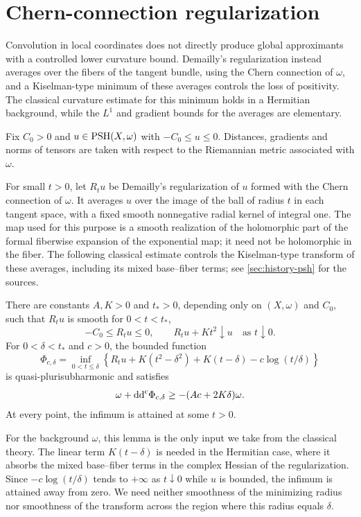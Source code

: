 \section{Chern-connection regularization}
\label{sec:psh-chern-regularization}

Convolution in local coordinates does not directly produce global approximants with a controlled lower curvature bound. Demailly's regularization instead averages over the fibers of the tangent bundle, using the Chern connection of $\omega$, and a Kiselman-type minimum of these averages controls the loss of positivity. The classical curvature estimate for this minimum holds in a Hermitian background, while the $L^1$ and gradient bounds for the averages are elementary.

Fix $C_0>0$ and $u\in\mathrm{PSH}(X,\omega)$ with $-C_0\leq u\leq0$. Distances, gradients and norms of tensors are taken with respect to the Riemannian metric associated with $\omega$.

For small $t>0$, let $R_tu$ be Demailly's regularization of $u$ formed with the Chern connection of $\omega$. It averages $u$ over the image of the ball of radius $t$ in each tangent space, with a fixed smooth nonnegative radial kernel of integral one. The map used for this purpose is a smooth realization of the holomorphic part of the formal fiberwise expansion of the exponential map; it need not be holomorphic in the fiber. The following classical estimate controls the Kiselman-type transform of these averages, including its mixed base--fiber terms; see \cref{sec:history-psh} for the sources.

\begin{lemma}\label{lem:chern-kiselman-input}
There are constants $A,K>0$ and $t_*>0$, depending only on $(X,\omega)$ and $C_0$, such that $R_tu$ is smooth for $0<t<t_*$,
\[
 -C_0\leq R_tu\leq0,\qquad
 R_tu+Kt^2\downarrow u\quad\text{as }t\downarrow0.
\]
For $0<\delta<t_*$ and $c>0$, the bounded function
\[
 \Phi_{c,\delta}
   =\inf_{0<t\leq\delta}
       \left\{R_tu+K(t^2-\delta^2)+K(t-\delta)
                         -c\log(t/\delta)\right\}
\]
is quasi-plurisubharmonic and satisfies
\[
 \omega+\mathrm{dd}^{\mathrm{c}}\Phi_{c,\delta}\geq-(Ac+2K\delta)\omega.
\]
At every point, the infimum is attained at some $t>0$.
\end{lemma}

For the background $\omega$, this lemma is the only input we take from the classical theory. The linear term $K(t-\delta)$ is needed in the Hermitian case, where it absorbs the mixed base--fiber terms in the complex Hessian of the regularization. Since $-c\log(t/\delta)$ tends to $+\infty$ as $t\downarrow0$ while $u$ is bounded, the infimum is attained away from zero. We need neither smoothness of the minimizing radius nor smoothness of the transform across the region where this radius equals $\delta$.

